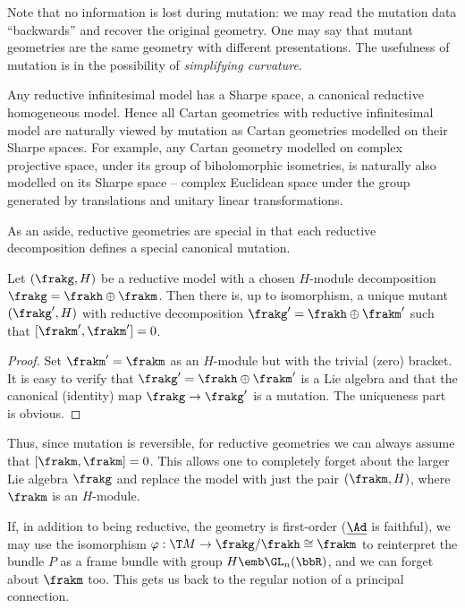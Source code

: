 Note that no information is lost during mutation: we may read the mutation data ``backwards'' and recover the original geometry. One may say that mutant geometries are the same geometry with different presentations. The usefulness of mutation is in the possibility of \emph{simplifying curvature}.

\begin{rem}
    Any reductive infinitesimal model has a Sharpe space, a canonical reductive homogeneous model. Hence all Cartan geometries with reductive infinitesimal model are naturally viewed by mutation as Cartan geometries modelled on their Sharpe spaces. For example, any Cartan geometry modelled on complex projective space, under its group of biholomorphic isometries, is naturally also modelled on its Sharpe space -- complex Euclidean space under the group generated by translations and unitary linear transformations.
\end{rem}

As an aside, reductive geometries are special in that each reductive decomposition defines a special canonical mutation.

\begin{lem}
    Let $(\frakg,H)$ be a reductive model with a chosen $H$-module decomposition $\frakg=\frakh\oplus\frakm$. Then there is, up to isomorphism, a unique mutant $(\frakg',H)$ with reductive decomposition $\frakg'=\frakh\oplus\frakm'$ such that $[\frakm',\frakm']=0$.
\end{lem}
\begin{proof}
    Set $\frakm'=\frakm$ as an $H$-module but with the trivial (zero) bracket. It is easy to verify that $\frakg'=\frakh\oplus\frakm'$ is a Lie algebra and that the canonical (identity) map $\frakg\to\frakg'$ is a mutation. The uniqueness part is obvious.
\end{proof}

Thus, since mutation is reversible, for reductive geometries we can always assume that $[\frakm,\frakm]=0$.  This allows one to completely forget about the larger Lie algebra $\frakg$ and replace the model with just the pair $(\frakm,H)$, where $\frakm$ is an $H$-module.

If, in addition to being reductive, the geometry is first-order ($\underline{\Ad}$ is faithful), we may use the isomorphism $\varphi:\T M\to \frakg\slash\frakh\cong\frakm$ to reinterpret the bundle $P$ as a frame bundle with group $H\emb \GL_n(\bbR)$, and we can forget about $\frakm$ too. This gets us back to the regular notion of a principal connection.







